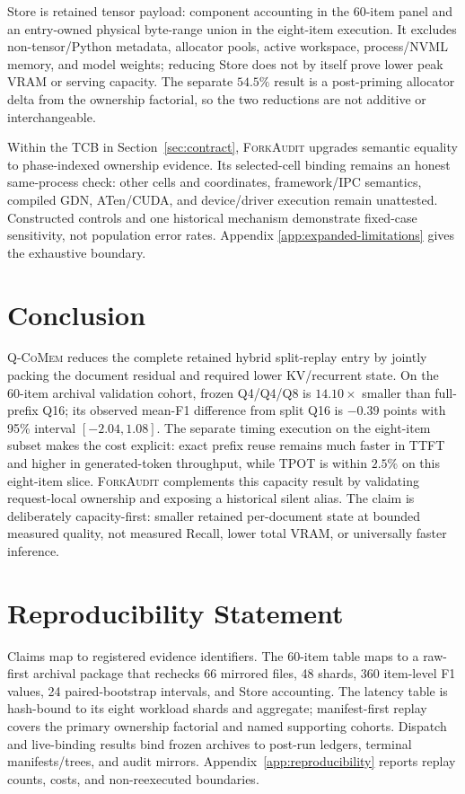 \documentclass{article}
\newcommand{\qcomem}{\textsc{Q-CoMem}}
\newcommand{\method}{\textsc{ForkAudit}}
\begin{document}
Store is retained tensor payload: component accounting in the 60-item panel and
an entry-owned physical byte-range union in the eight-item execution.  It
excludes non-tensor/Python metadata, allocator pools, active workspace,
process/NVML memory, and model weights; reducing Store does not by itself prove lower peak VRAM or
serving capacity.  The separate
$54.5\%$ result is a post-priming allocator delta from the ownership factorial,
so the two reductions are not additive or interchangeable.

Within the TCB in Section~\ref{sec:contract}, \method{} upgrades semantic
equality to phase-indexed ownership evidence.  Its selected-cell binding remains
an honest same-process check: other cells and coordinates, framework/IPC
semantics, compiled GDN, ATen/CUDA, and device/driver execution remain
unattested.  Constructed controls and one historical mechanism demonstrate
fixed-case sensitivity, not population error rates.  Appendix
\ref{app:expanded-limitations} gives the exhaustive boundary.

\FloatBarrier

\section{Conclusion}

\qcomem{} reduces the complete retained hybrid split-replay entry by jointly
packing the document residual and required lower KV/recurrent state.  On the
60-item archival validation cohort, frozen Q4/Q4/Q8 is $14.10\times$ smaller
than full-prefix Q16; its observed mean-F1 difference from split Q16 is
$-0.39$ points with 95\% interval $[-2.04,1.08]$.  The separate timing
execution on the eight-item subset makes the cost explicit: exact prefix reuse
remains much faster in TTFT and
higher in generated-token throughput, while TPOT is within $2.5\%$ on this
eight-item slice.  \method{} complements this capacity result by validating
request-local ownership and exposing a historical silent alias.  The claim is
deliberately capacity-first: smaller retained per-document state at bounded
measured quality, not measured Recall, lower total VRAM, or universally faster
inference.

\section*{Reproducibility Statement}
Claims map to registered evidence identifiers.  The 60-item table maps to a
raw-first archival package that rechecks 66 mirrored files, 48 shards, 360
item-level F1 values, 24 paired-bootstrap intervals, and Store accounting.  The
latency table is hash-bound to its eight workload shards and aggregate;
manifest-first replay covers the primary ownership factorial and named
supporting cohorts.  Dispatch and live-binding results bind frozen archives to
post-run ledgers, terminal manifests/trees, and audit mirrors.
Appendix~\ref{app:reproducibility} reports replay counts, costs, and
non-reexecuted boundaries.
\end{document}
